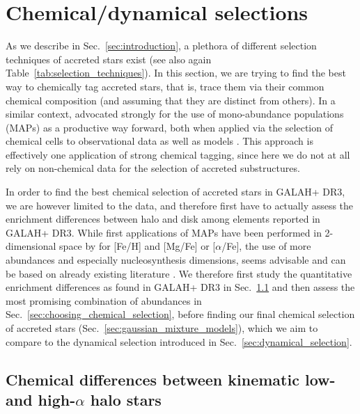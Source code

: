\documentclass[fleqn,usenatbib]{mnras}
\begin{document}
\section{Chemical/dynamical selections} \label{sec:our_selection_techniques}

As we describe in Sec.~\ref{sec:introduction}, a plethora of different selection techniques of accreted stars exist (see also again Table~\ref{tab:selection_techniques}). In this section, we are trying to find the best way to chemically tag \citep{FreemanBlandHawthorn2002} accreted stars, that is, trace them via their common chemical composition (and assuming that they are distinct from others). In a similar context, \citet{Rix2013} advocated strongly for the use of mono-abundance populations (MAPs) as a productive way forward, both when applied via the selection of chemical cells \citep{Lu2021} to observational data \citep[e.g.][]{Bovy2012, Bovy2012b, Bovy2016} as well as models \citep[e.g.][]{Bird2013, Minchev2017}. This approach is effectively one application of strong chemical tagging, since here we do not at all rely on non-chemical data for the selection of accreted substructures. 

In order to find the best chemical selection of accreted stars in GALAH+ DR3, we are however limited to the data, and therefore first have to actually assess the enrichment differences between halo and disk among elements reported in GALAH+ DR3. While first applications of MAPs have been performed in 2-dimensional space by \citet{Navarro2011,DiMatteo2019,Carollo2021} for [Fe/H] and [Mg/Fe] or [$\alpha$/Fe], the use of more abundances and especially nucleosynthesis dimensions, seems advisable and can be based on already existing literature \citep{Nissen2010,Nissen2011,Nissen2012, Nissen2014, Hawkins2015, Hayes2018, Das2020}. We therefore first study the quantitative enrichment differences as found in GALAH+ DR3 in Sec.~\ref{sec:enrichment_differences} and then assess the most promising combination of abundances in Sec.~\ref{sec:choosing_chemical_selection}, before finding our final chemical selection of accreted stars (Sec.~\ref{sec:gaussian_mixture_models}), which we aim to compare to the dynamical selection introduced in Sec.~\ref{sec:dynamical_selection}.

\subsection{Chemical differences between kinematic low- and high-$\alpha$ halo stars} \label{sec:enrichment_differences}
\end{document}
